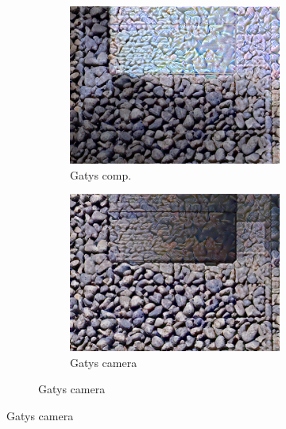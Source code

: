 \begin{figure}[]
\begin{subfigure}{\textwidth}
\begin{subfigure}{0.24\textwidth}
            \includegraphics[width=\textwidth]{images/04-experiment02/carpet/pebbles/gatys_im.jpg}
            \caption*{Gatys comp.}
        \end{subfigure}
        \hfill
        \begin{subfigure}{0.24\textwidth}
            \centering
            \includegraphics[width=\textwidth]{images/04-experiment02/carpet/pebbles/gatys_proj.jpg}
            \caption*{Gatys camera}
        \end{subfigure}
        

\end{subfigure}
\end{figure}
